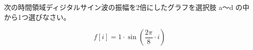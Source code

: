 次の時間領域ディジタルサイン波の振幅を2倍にしたグラフを選択肢 a〜d の中から1つ選びなさい。

\[
f[i] = 1 \cdot \sin \left ( \frac{2 \pi}{8}  \cdot i \right )
\]

